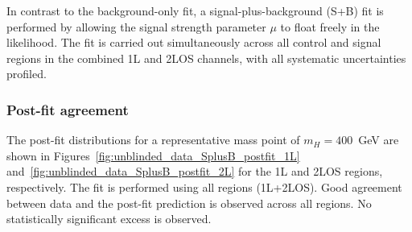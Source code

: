 In contrast to the background-only fit, a signal-plus-background (S+B) fit is performed by allowing the signal strength parameter $\mu$ to float freely in the likelihood.
The fit is carried out simultaneously across all control and signal regions in the combined 1L and 2LOS channels, with all systematic uncertainties profiled. 

\subsubsection*{\textbf{Post-fit agreement}}

The post-fit distributions for a representative mass point of $m_H=400$~GeV are shown in Figures~\ref{fig:unblinded_data_SplusB_postfit_1L} and~\ref{fig:unblinded_data_SplusB_postfit_2L} for the 1L and 2LOS regions, respectively. 
The fit is performed using all regions (1L+2LOS). 
Good agreement between data and the post-fit prediction is observed across all regions. 
No statistically significant excess is observed.

